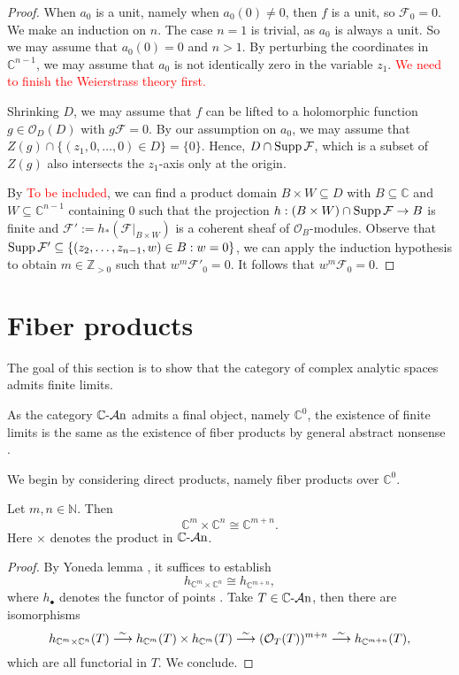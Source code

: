 \begin{proof}
    When $a_0$ is a unit, namely when $a_0(0)\neq 0$, then $f$ is a unit, so $\mathcal{F}_0=0$. We make an induction on $n$. The case $n=1$ is trivial, as $a_0$ is always a unit.
    So we may assume that $a_0(0)=0$ and $n>1$. By perturbing the coordinates in $\mathbb{C}^{n-1}$, we may assume that $a_0$ is not identically zero in the variable $z_1$. \textcolor{red}{We need to finish the Weierstrass theory first.}
    
    Shrinking $D$, we may assume that $f$ can be lifted to a holomorphic function $g\in \mathcal{O}_D(D)$ with $g\mathcal{F}=0$. By our assumption on $a_0$, we may assume that $Z(g)\cap \{(z_1,0,\ldots,0)\in D\}=\{0\}$. Hence, $D\cap \operatorname{Supp} \mathcal{F}$, which is a subset of $Z(g)$ also intersects the $z_1$-axis only at the origin.

    By \textcolor{red}{To be included}, we can find a product domain $B\times W\subseteq D$ with $B\subseteq \mathbb{C}$ and $W\subseteq \mathbb{C}^{n-1}$ containing $0$ such that the projection $h:(B\times W)\cap \operatorname{Supp} \mathcal{F}\rightarrow B$ is finite and $\mathcal{F}':=h_*(\mathcal{F}|_{B\times W})$ is a coherent sheaf of $\mathcal{O}_B$-modules. Observe that $\operatorname{Supp} \mathcal{F}'\subseteq \{(z_2,\ldots,z_{n-1},w)\in B:w=0\}$, we can apply the induction hypothesis to obtain $m\in \mathbb{Z}_{>0}$ such that $w^{m}\mathcal{F}'_0=0$. It follows that $w^{m}\mathcal{F}_0=0$.
\end{proof}

\section{Fiber products}

The goal of this section is to show that the category of complex analytic spaces admits finite limits.

As the category $\mathbb{C}\text{-}\mathcal{A}\mathrm{n}$ admits a final object, namely $\mathbb{C}^0$, the existence of finite limits is the same as the existence of fiber products by general abstract nonsense \cite[\href{https://stacks.math.columbia.edu/tag/002O}{Tag 002O}]{stacks-project}.

We begin by considering direct products, namely fiber products over $\mathbb{C}^0$. 

\begin{lemma}\label{lma-CmCnproductexist}
Let $m,n\in \mathbb{N}$. Then 
\[
    \mathbb{C}^m\times \mathbb{C}^n\cong \mathbb{C}^{m+n}. 
\]    
Here $\times$ denotes the product in $\mathbb{C}\text{-}\mathcal{A}\mathrm{n}$.
\end{lemma}
\begin{proof}
    By Yoneda lemma \cite[\href{https://stacks.math.columbia.edu/tag/001P}{Tag 001P}]{stacks-project}, it suffices to establish
    \[
        h_{\mathbb{C}^m\times \mathbb{C}^n}\cong h_{\mathbb{C}^{m+n}},
    \]
    where $h_{\bullet}$ denotes the functor of points \cite[\href{https://stacks.math.columbia.edu/tag/001O}{Tag 001O}]{stacks-project}. Take $T\in \mathbb{C}\text{-}\mathcal{A}\mathrm{n}$, then there are isomorphisms
    \[
        h_{\mathbb{C}^m\times \mathbb{C}^n}(T)\stackrel{\sim}{\longrightarrow} h_{\mathbb{C}^m}(T)\times h_{\mathbb{C}^m}(T)\stackrel{\sim}{\longrightarrow} (\mathcal{O}_{T}(T))^{m+n}\stackrel{\sim}{\longrightarrow}   h_{\mathbb{C}^{m+n}}(T),
    \]
    which are all functorial in $T$. We conclude.
\end{proof}

